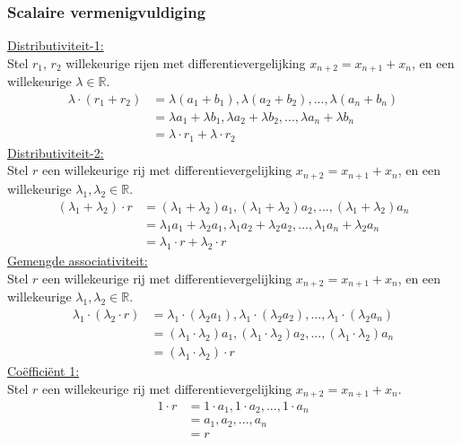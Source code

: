 \documentclass[10pt,a4paper]{article}
\begin{document}
\subsubsection*{Scalaire vermenigvuldiging}
\underline{Distributiviteit-1:}\\
Stel $r_1$, $r_2$ willekeurige rijen met differentievergelijking $x_{n + 2} = x_{n + 1} + x_n$, en een willekeurige $\lambda \in \mathbb{R}$.
\begin{align*}
    \lambda \cdot(r_1 + r_2) &= \lambda (a_1 + b_1), \lambda (a_2 + b_2), ..., \lambda (a_n + b_n)\\
    &= \lambda a_1 + \lambda b_1, \lambda a_2 + \lambda b_2, ..., \lambda a_n + \lambda b_n\\
    &= \lambda \cdot r_1 + \lambda \cdot r_2
\end{align*}
\underline{Distributiviteit-2:}\\
Stel $r$ een willekeurige rij met differentievergelijking $x_{n + 2} = x_{n + 1} + x_n$, en een willekeurige $\lambda_1 , \lambda_2 \in \mathbb{R}$.
\begin{align*}
    (\lambda_1 + \lambda_2) \cdot r &= (\lambda_1 + \lambda_2) a_1, (\lambda_1 + \lambda_2) a_2, ..., (\lambda_1 + \lambda_2) a_n\\
    &= \lambda_1 a_1 + \lambda_2 a_1, \lambda_1 a_2 + \lambda_2 a_2, ..., \lambda_1 a_n + \lambda_2 a_n\\
    &= \lambda_1 \cdot r + \lambda_2 \cdot r
\end{align*}
\underline{Gemengde associativiteit:}\\
Stel $r$ een willekeurige rij met differentievergelijking $x_{n + 2} = x_{n + 1} + x_n$, en een willekeurige $\lambda_1 , \lambda_2 \in \mathbb{R}$.
\begin{align*}
    \lambda_1 \cdot (\lambda_2 \cdot r) &= \lambda_1 \cdot (\lambda_2 a_1), \lambda_1 \cdot (\lambda_2 a_2), ..., \lambda_1 \cdot (\lambda_2 a_n)\\
    &= (\lambda_1 \cdot \lambda_2) a_1, (\lambda_1 \cdot \lambda_2) a_2, ..., (\lambda_1 \cdot \lambda_2) a_n\\
    &= (\lambda_1 \cdot \lambda_2) \cdot r
\end{align*}
\underline{Co\"effici\"ent 1:}\\
Stel $r$ een willekeurige rij met differentievergelijking $x_{n + 2} = x_{n + 1} + x_n$.
\begin{align*}
     1 \cdot r &= 1 \cdot a_1, 1 \cdot a_2, ..., 1 \cdot a_n\\
     &= a_1, a_2, ..., a_n\\
     &= r
\end{align*}
\end{document}
